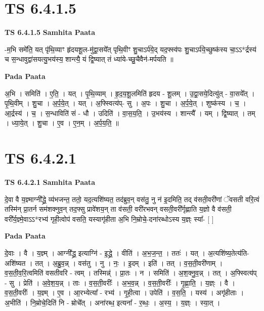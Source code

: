 \documentclass[17pt]{extarticle}
\begin{document}

\section{ TS 6.4.1.5 }

\textbf{TS 6.4.1.5 } \newline
\textbf{Samhita Paata} \newline

-म॒भि समे॑ति॒ यत् पृ॑थि॒व्याꣳ हृ॑दयशू॒ल-मु॑द्वा॒सये᳚त् पृथि॒वीꣳ शु॒चाऽर्प॑ये॒द् यद॒फ्स्व॑पः शु॒चाऽर्प॑ये॒च्छुष्क॑स्य चा॒ऽऽ*र्द्रस्य॑ च स॒न्धावुद्वा॑सयत्यु॒भय॑स्य॒ शान्त्यै॒ यं द्वि॒ष्यात् तं ध्या॑ये-च्छु॒चैवैन॑-मर्पयति ॥ \newline

\textbf{Pada Paata} \newline

अ॒भि । समिति॑ । ए॒ति॒ । यत् । पृ॒थि॒व्याम् । हृ॒द॒य॒शू॒लमिति॑ हृदय - शू॒लम् । उ॒द्वा॒सये॒दित्यु॑त् - वा॒सये᳚त् । पृ॒थि॒वीम् । शु॒चा । अ॒र्प॒ये॒त् । यत् । अ॒फ्स्वित्य॑प्- सु । अ॒पः । शु॒चा । अ॒र्प॒ये॒त् । शुष्क॑स्य । च॒ । आ॒र्द्रस्य॑ । च॒ । स॒न्धाविति॑ सं - धौ । उदिति॑ । वा॒स॒य॒ति॒ । उ॒भय॑स्य । शान्त्यै᳚ । यम् । द्वि॒ष्यात् । तम् । ध्या॒ये॒त् । शु॒चा । ए॒व । ए॒न॒म् । अ॒र्प॒य॒ति॒ ॥  \newline





\section{ TS 6.4.2.1 }

\textbf{TS 6.4.2.1 } \newline
\textbf{Samhita Paata} \newline

दे॒वा वै य॒ज्ञ्माग्नी᳚द्ध्रे॒ व्य॑भजन्त॒ ततो॒ यद॒त्यशि॑ष्यत॒ तद॑ब्रुव॒न् वस॑तु॒ नु न॑ इ॒दमिति॒ तद् व॑सती॒वरी॑णां ॅवसती वरि॒त्वं तस्मि॑न् प्रा॒तर्न सम॑शक्नुव॒न् तद॒फ्सु प्रावे॑शय॒न् ता व॑सती॒ वरी॑रभवन् वसती॒वरी᳚र्गृह्णाति य॒ज्ञो वै व॑सती॒ वरी᳚र्य॒ज्ञ्मे॒वाऽऽ*रभ्य॑ गृही॒त्वोप॑ वसति॒ यस्यागृ॑हीता अ॒भि नि॒म्रोचे॒-दना॑रब्धोऽस्य य॒ज्ञ्ः स्या᳚- [  ] \newline

\textbf{Pada Paata} \newline

दे॒वाः । वै । य॒ज्ञ्म् । आग्नी᳚द्ध्र॒ इत्याग्नि॑ - इ॒द्ध्रे॒ । वीति॑ । अ॒भ॒ज॒न्त॒ । ततः॑ । यत् । अ॒त्यशि॑ष्य॒तेत्य॑ति-अशि॑ष्यत । तत् । अ॒ब्रु॒व॒न्न् । वस॑तु । नु । नः॒ । इ॒दम् । इति॑ । तत् । व॒स॒ती॒वरी॑णाम् । व॒स॒ती॒व॒रि॒त्वमिति॑ वसतीवरि - त्वम् । तस्मिन्न्॑ । प्रा॒तः । न । समिति॑ । अ॒श॒क्नु॒व॒न्न् । तत् । अ॒फ्स्वित्य॑प् - सु । प्रेति॑ । अ॒वे॒श॒य॒न्न् । ताः । व॒स॒ती॒वरीः᳚ । अ॒भ॒व॒न्न् । व॒स॒ती॒वरीः᳚ । गृ॒ह्णा॒ति॒ । य॒ज्ञ्ः । वै । व॒स॒ती॒वरीः᳚ । य॒ज्ञ्म् । ए॒व । आ॒रभ्येत्या᳚ - रभ्य॑ । गृ॒ही॒त्वा । उपेति॑ । व॒स॒ति॒ । यस्य॑ । अगृ॑हीताः । अ॒भीति॑ । नि॒म्रोचे॒दिति॑ नि - म्रोचे᳚त् । अना॑रब्ध॒ इत्यना᳚ - र॒ब्धः॒ । अ॒स्य॒ । य॒ज्ञ्ः । स्या॒त् ।  \newline
\end{document}

